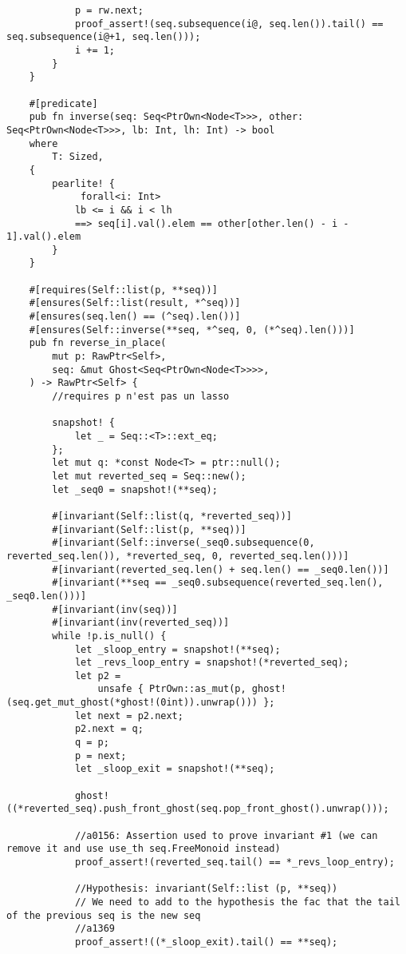 \begin{verbatim}
            p = rw.next;
            proof_assert!(seq.subsequence(i@, seq.len()).tail() == seq.subsequence(i@+1, seq.len()));
            i += 1;
        }
    }

    #[predicate]
    pub fn inverse(seq: Seq<PtrOwn<Node<T>>>, other: Seq<PtrOwn<Node<T>>>, lb: Int, lh: Int) -> bool
    where
        T: Sized,
    {
        pearlite! {
             forall<i: Int>
            lb <= i && i < lh
            ==> seq[i].val().elem == other[other.len() - i - 1].val().elem
        }
    }

    #[requires(Self::list(p, **seq))]
    #[ensures(Self::list(result, *^seq))]
    #[ensures(seq.len() == (^seq).len())]
    #[ensures(Self::inverse(**seq, *^seq, 0, (*^seq).len()))]
    pub fn reverse_in_place(
        mut p: RawPtr<Self>,
        seq: &mut Ghost<Seq<PtrOwn<Node<T>>>>,
    ) -> RawPtr<Self> {
        //requires p n'est pas un lasso

        snapshot! {
            let _ = Seq::<T>::ext_eq;
        };
        let mut q: *const Node<T> = ptr::null();
        let mut reverted_seq = Seq::new();
        let _seq0 = snapshot!(**seq);

        #[invariant(Self::list(q, *reverted_seq))]
        #[invariant(Self::list(p, **seq))]
        #[invariant(Self::inverse(_seq0.subsequence(0, reverted_seq.len()), *reverted_seq, 0, reverted_seq.len()))]
        #[invariant(reverted_seq.len() + seq.len() == _seq0.len())]
        #[invariant(**seq == _seq0.subsequence(reverted_seq.len(), _seq0.len()))]
        #[invariant(inv(seq))]
        #[invariant(inv(reverted_seq))]
        while !p.is_null() {
            let _sloop_entry = snapshot!(**seq);
            let _revs_loop_entry = snapshot!(*reverted_seq);
            let p2 =
                unsafe { PtrOwn::as_mut(p, ghost!(seq.get_mut_ghost(*ghost!(0int)).unwrap())) };
            let next = p2.next;
            p2.next = q;
            q = p;
            p = next;
            let _sloop_exit = snapshot!(**seq);

            ghost!((*reverted_seq).push_front_ghost(seq.pop_front_ghost().unwrap()));

            //a0156: Assertion used to prove invariant #1 (we can remove it and use use_th seq.FreeMonoid instead)
            proof_assert!(reverted_seq.tail() == *_revs_loop_entry);

            //Hypothesis: invariant(Self::list (p, **seq))
            // We need to add to the hypothesis the fac that the tail of the previous seq is the new seq
            //a1369
            proof_assert!((*_sloop_exit).tail() == **seq);


\end{verbatim}
